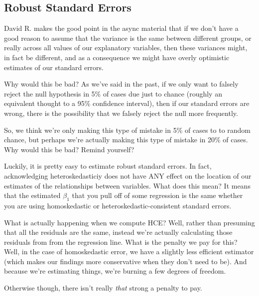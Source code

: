 \documentclass[
]{article}
\begin{document}
\hypertarget{robust-standard-errors}{%
\subsection{Robust Standard Errors}\label{robust-standard-errors}}

David R. makes the good point in the async material that if we don't have a good reason to assume that the variance is the same between different groups, or really across all values of our explanatory variables, then these variances might, in fact be different, and as a consequence we might have overly optimistic estimates of our standard errors.

Why would this be bad? As we've said in the past, if we only want to falsely reject the null hypothesis in 5\% of cases due just to chance (roughly an equivalent thought to a 95\% confidence interval), then if our standard errors are wrong, there is the possibility that we falsely reject the null more frequently.

So, we think we're only making this type of mistake in 5\% of cases to to random chance, but perhaps we're actually making this type of mistake in 20\% of cases. Why would this be bad? Remind yourself?

Luckily, it is pretty easy to estimate robust standard errors. In fact, acknowledging heteroskedasticiy does not have ANY effect on the location of our estimates of the relationships between variables. What does this mean? It means that the estimated \(\beta_{1}\) that you pull off of some regression is the same whether you are using homoskedastic or heteroskedastic-consistent standard errors.

What is actually happening when we compute HCE? Well, rather than presuming that all the residuals are the same, instead we're actually calculating those residuals from from the regression line. What is the penalty we pay for this? Well, in the case of homoskedastic error, we have a slightly less efficient estimator (which makes our findings more conservative when they don't need to be). And because we're estimating things, we're burning a few degrees of freedom.

Otherwise though, there isn't really \emph{that} strong a penalty to pay.
\end{document}
